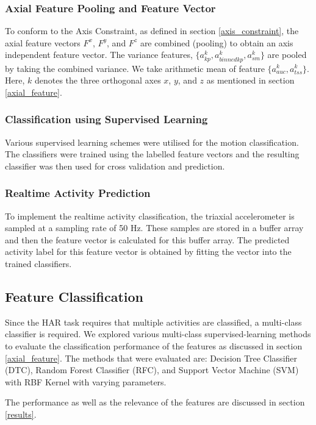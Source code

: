 \documentclass[
10pt,           %
a4paper,        %
oneside,        %
headinclude,footinclude, %
]{scrartcl}
\begin{document}
\subsubsection{Axial Feature Pooling and Feature Vector}
To conform to the Axis Constraint, as defined in section \ref{axis_constraint}, the axial feature vectors $F^x$, $F^y$, and $F^z$ are combined (pooling) to obtain an axis independent feature vector. The variance features, $ \{a_{kp}^k, a_{binnedkp}^k, a_{sm}^k\} $ are pooled by taking the combined variance. We take arithmetic mean of feature $ \{a_{auc}^k, a_{tss}^k\} $. Here, $k$ denotes the three orthogonal axes $x$, $y$, and $z$ as mentioned in section \ref{axial_feature}.


\subsubsection{Classification using Supervised Learning}
Various supervised learning schemes were utilised for the motion classification. The classifiers were trained using the labelled feature vectors and the resulting classifier was then used for cross validation and prediction.

\subsubsection{Realtime Activity Prediction}
To implement the realtime activity classification, the triaxial accelerometer is sampled at a sampling rate of 50 Hz. These samples are stored in a buffer array and then the feature vector is  calculated for this buffer array. The predicted activity label for this feature vector is obtained by fitting the vector into the trained classifiers.

\subsection{Feature Classification}
\label{feature_classification}

Since the \gls{HAR} task requires that multiple activities are classified, a multi-class classifier is required. We explored various multi-class supervised-learning methods to evaluate the classification performance of the features as discussed in section \ref{axial_feature}. The methods that were evaluated are: Decision Tree Classifier (\gls{DTC}), Random Forest Classifier (\gls{RFC}), and Support Vector Machine (\gls{SVM}) with \gls{RBF} Kernel with varying parameters.

The performance as well as the relevance of the features are discussed in section \ref{results}.
\end{document}

